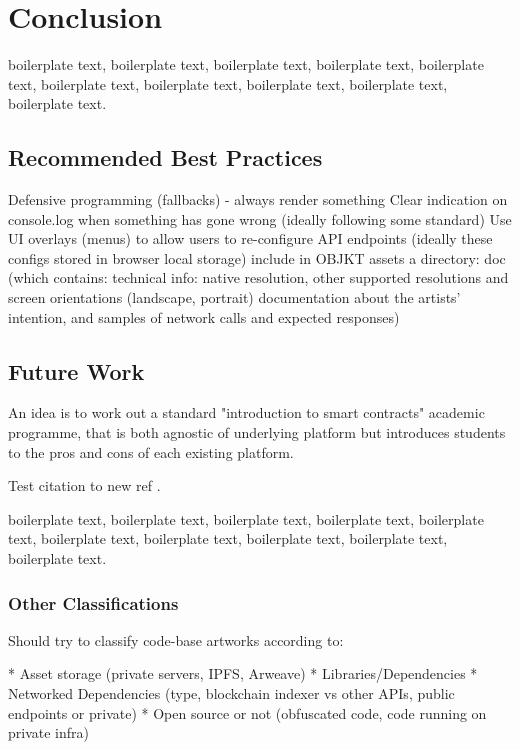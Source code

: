 \chapter{Conclusion}


boilerplate text, boilerplate text, boilerplate text, boilerplate text, boilerplate text, boilerplate text, boilerplate text, boilerplate text, boilerplate text, boilerplate text.



\section{Recommended Best Practices}


Defensive programming (fallbacks) - always render something
Clear indication on console.log when something has gone wrong (ideally following some standard)
Use UI overlays (menus) to allow users to re-configure API endpoints (ideally these configs stored in browser local storage)
include in OBJKT assets a directory: doc (which contains:
								technical info: native resolution, other supported resolutions and screen orientations (landscape, portrait)
								documentation about the artists' intention, and samples of network calls and expected responses)







\section{Future Work}


An idea is to work out a standard "introduction to smart contracts" academic programme, that is both agnostic of underlying platform but introduces students to the pros and cons of each existing platform.

Test citation to new ref  \cite{dekkerCollectingConservingNet2018}.

boilerplate text, boilerplate text, boilerplate text, boilerplate text, boilerplate text, boilerplate text, boilerplate text, boilerplate text, boilerplate text, boilerplate text.


\subsection{Other Classifications}

Should try to classify code-base artworks according to:

* Asset storage (private servers, IPFS, Arweave)
* Libraries/Dependencies
* Networked Dependencies (type, blockchain indexer vs other APIs, public endpoints or private)
* Open source or not (obfuscated code, code running on private infra)



